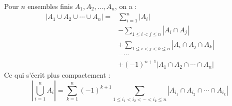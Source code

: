 \begin{theorembox}
Pour $n$ ensembles finis $A_1, A_2, \dots, A_n$, on a :
\begin{align*}
|A_1 \cup A_2 \cup \cdots \cup A_n| = & \sum_{i=1}^n |A_i| \\
& - \sum_{1 \leq i < j \leq n} |A_i \cap A_j| \\
& + \sum_{1 \leq i < j < k \leq n} |A_i \cap A_j \cap A_k| \\
& - \cdots \\
& + (-1)^{n+1} |A_1 \cap A_2 \cap \cdots \cap A_n|
\end{align*}
Ce qui s'écrit plus compactement :
$$ \left| \bigcup_{i=1}^n A_i \right| = \sum_{k=1}^n (-1)^{k+1} \sum_{1 \leq i_1 < i_2 < \cdots < i_k \leq n} |A_{i_1} \cap A_{i_2} \cap \cdots \cap A_{i_k}| $$
\end{theorembox}

